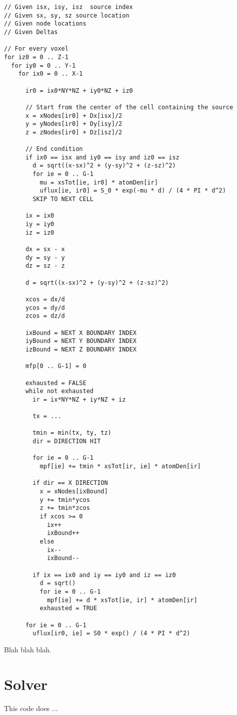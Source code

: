 \begin{listing}
\begin{verbatim}
// Given isx, isy, isz  source index
// Given sx, sy, sz source location
// Given node locations
// Given Deltas

// For every voxel
for iz0 = 0 .. Z-1
  for iy0 = 0 .. Y-1
    for ix0 = 0 .. X-1
    
      ir0 = ix0*NY*NZ + iy0*NZ + iz0
    
      // Start from the center of the cell containing the source
      x = xNodes[ir0] + Dx[isx]/2
      y = yNodes[ir0] + Dy[isy]/2
      z = zNodes[ir0] + Dz[isz]/2
      
      // End condition
      if ix0 == isx and iy0 == isy and iz0 == isz
        d = sqrt((x-sx)^2 + (y-sy)^2 + (z-sz)^2)
        for ie = 0 .. G-1
          mu = xsTot[ie, ir0] * atomDen[ir]
          uflux[ie, ir0] = S_0 * exp(-mu * d) / (4 * PI * d^2)
        SKIP TO NEXT CELL
        
      ix = ix0
      iy = iy0
      iz = iz0
      
      dx = sx - x
      dy = sy - y
      dz = sz - z
      
      d = sqrt((x-sx)^2 + (y-sy)^2 + (z-sz)^2)
      
      xcos = dx/d
      ycos = dy/d
      zcos = dz/d
      
      ixBound = NEXT X BOUNDARY INDEX
      iyBound = NEXT Y BOUNDARY INDEX
      izBound = NEXT Z BOUNDARY INDEX
      
      mfp[0 .. G-1] = 0
      
      exhausted = FALSE
      while not exhausted
        ir = ix*NY*NZ + iy*NZ + iz      
      
        tx = ...
        
        tmin = min(tx, ty, tz)
        dir = DIRECTION HIT
        
        for ie = 0 .. G-1
          mpf[ie] += tmin * xsTot[ir, ie] * atomDen[ir]
          
        if dir == X DIRECTION
          x = xNodes[ixBound]
          y += tmin*ycos
          z += tmin*zcos
          if xcos >= 0
            ix++
            ixBound++
          else
            ix--
            ixBound--
            
        if ix == ix0 and iy == iy0 and iz == iz0
          d = sqrt()
          for ie = 0 .. G-1
            mpf[ie] += d * xsTot[ie, ir] * atomDen[ir]
          exhausted = TRUE
          
      for ie = 0 .. G-1
        uflux[ir0, ie] = S0 * exp() / (4 * PI * d^2)

\end{verbatim}
\caption{Blah blah blah.}\label{lst:sync1}
\end{listing}

\section{Solver}

This code does ...

\endinput

